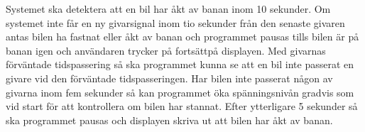 Systemet ska detektera att en bil har åkt av banan inom 10 sekunder. Om systemet
inte får en ny givarsignal inom tio sekunder från den senaste givaren antas bilen ha
fastnat eller åkt av banan och programmet pausas tills bilen är på banan igen
och användaren trycker på \textquotedbl fortsätt\textquotedbl på displayen. Med givarnas förväntade tidspassering så ska programmet kunna se att en bil inte passerat en givare vid den förväntade tidspasseringen. Har bilen inte passerat någon av givarna inom fem sekunder så kan programmet öka spänningsnivån gradvis som vid start för att kontrollera om bilen har stannat. Efter ytterligare 5 sekunder så ska programmet pausas och displayen skriva ut att bilen har åkt av banan.

